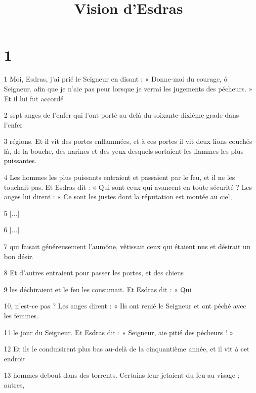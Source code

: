

\title{Vision d'Esdras}

\chapter{1}

\par 1 Moi, Esdras, j'ai prié le Seigneur en disant : « Donne-moi du courage, ô Seigneur, afin que je n'aie pas peur lorsque je verrai les jugements des pécheurs. » Et il lui fut accordé

\par 2 sept anges de l'enfer qui l'ont porté au-delà du soixante-dixième grade dans l'enfer

\par 3 régions. Et il vit des portes enflammées, et à ces portes il vit deux lions couchés là, de la bouche, des narines et des yeux desquels sortaient les flammes les plus puissantes.

\par 4 Les hommes les plus puissants entraient et passaient par le feu, et il ne les touchait pas. Et Esdras dit : « Qui sont ceux qui avancent en toute sécurité ? Les anges lui dirent : « Ce sont les justes dont la réputation est montée au ciel,

\par 5 [...]

\par 6 [...]

\par 7 qui faisait généreusement l'aumône, vêtissait ceux qui étaient nus et désirait un bon désir.

\par 8 Et d'autres entraient pour passer les portes, et des chiens

\par 9 les déchiraient et le feu les consumait. Et Esdras dit : « Qui

\par 10, n'est-ce pas ? Les anges dirent : « Ils ont renié le Seigneur et ont péché avec les femmes.

\par 11 le jour du Seigneur. Et Esdras dit : « Seigneur, aie pitié des pécheurs ! »

\par 12 Et ils le conduisirent plus bas au-delà de la cinquantième année, et il vit à cet endroit

\par 13 hommes debout dans des torrents. Certains leur jetaient du feu au visage ; autres,

